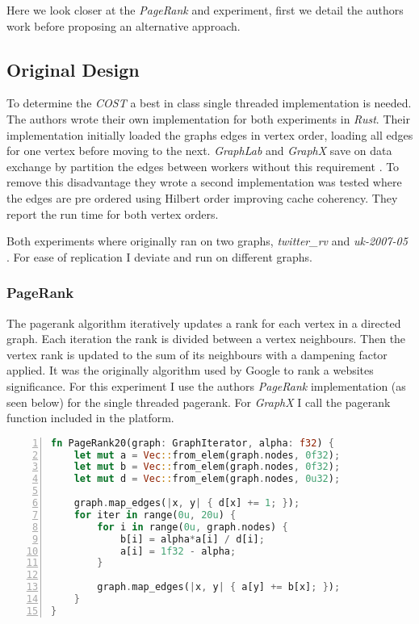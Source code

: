 Here we look closer at the \textit{PageRank} and  experiment, first we detail the authors work before proposing an alternative approach.

\subsection{Original Design} \label{sec:hilbert}
To determine the \textit{COST} a best in class single threaded implementation is needed. The authors wrote their own implementation for both experiments in \textit{Rust}. Their implementation initially loaded the graphs edges in vertex order, loading all edges for one vertex before moving to the next. \textit{GraphLab} and \textit{GraphX} save on data exchange by partition the edges between workers without this requirement \cite{graphlab,graphx}. To remove this disadvantage they wrote a second implementation was tested where the edges are pre ordered using Hilbert order improving cache coherency. They report the run time for both vertex orders.

Both experiments where originally ran on two graphs, \textit{twitter\_rv} \cite{twitter} and \textit{uk-2007-05} \cite{uk2007}. For ease of replication I deviate and run on different graphs.

\subsubsection{PageRank}
The pagerank algorithm iteratively updates a rank for each vertex in a directed graph. Each iteration the rank is divided between a vertex neighbours. Then the vertex rank is updated to the sum of its neighbours with a dampening factor applied. It was the originally algorithm used by Google to rank a websites significance. For this experiment I use the authors \textit{PageRank} implementation (as seen below) for the single threaded pagerank. For \textit{GraphX} I call the pagerank function included in the platform.

\begin{lstlisting}[caption={Rust, PageRank},language=Rust,numbers=left,breaklines=true, label={lst:pagerank}]
fn PageRank20(graph: GraphIterator, alpha: f32) {
	let mut a = Vec::from_elem(graph.nodes, 0f32);
	let mut b = Vec::from_elem(graph.nodes, 0f32);
	let mut d = Vec::from_elem(graph.nodes, 0u32);
	
	graph.map_edges(|x, y| { d[x] += 1; });
	for iter in range(0u, 20u) {
		for i in range(0u, graph.nodes) {
			b[i] = alpha*a[i] / d[i];
			a[i] = 1f32 - alpha;
		}

		graph.map_edges(|x, y| { a[y] += b[x]; });
	}
}
\end{lstlisting}

